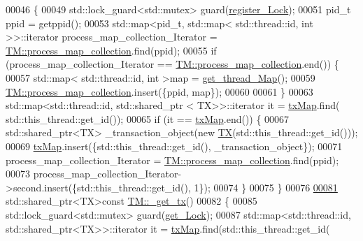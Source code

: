 \begin{DoxyCode}
00046 \{
00049     std::lock\_guard<std::mutex> guard(\hyperlink{class_t_m_aeb26546681bfe64e21606b8c012bb8c3_aeb26546681bfe64e21606b8c012bb8c3}{register\_Lock});
00051     pid\_t ppid = getppid();
00053     std::map<pid\_t, std::map< std::thread::id, int >>::iterator process\_map\_collection\_Iterator = 
      \hyperlink{class_t_m_a6d417b18213968da2a70a914e80d639b_a6d417b18213968da2a70a914e80d639b}{TM::process\_map\_collection}.find(ppid);
00055     \textcolor{keywordflow}{if} (process\_map\_collection\_Iterator == \hyperlink{class_t_m_a6d417b18213968da2a70a914e80d639b_a6d417b18213968da2a70a914e80d639b}{TM::process\_map\_collection}.end()) \{
00057         std::map< std::thread::id, int >map = \hyperlink{class_t_m_afb8bc9f42fe06c52747beb7f4c46915c_afb8bc9f42fe06c52747beb7f4c46915c}{get\_thread\_Map}();
00059         \hyperlink{class_t_m_a6d417b18213968da2a70a914e80d639b_a6d417b18213968da2a70a914e80d639b}{TM::process\_map\_collection}.insert(\{ppid, map\});
00060 
00061     \}
00063     std::map<std::thread::id, std::shared\_ptr < TX>>::iterator it = \hyperlink{class_t_m_a0333dfa193ea99d7626de74a2b932e9b_a0333dfa193ea99d7626de74a2b932e9b}{txMap}.find(
      std::this\_thread::get\_id());
00065     \textcolor{keywordflow}{if} (it == \hyperlink{class_t_m_a0333dfa193ea99d7626de74a2b932e9b_a0333dfa193ea99d7626de74a2b932e9b}{txMap}.end()) \{
00067         std::shared\_ptr<TX> \_transaction\_object(\textcolor{keyword}{new} \hyperlink{class_t_x}{TX}(std::this\_thread::get\_id()));
00069         \hyperlink{class_t_m_a0333dfa193ea99d7626de74a2b932e9b_a0333dfa193ea99d7626de74a2b932e9b}{txMap}.insert(\{std::this\_thread::get\_id(), \_transaction\_object\});
00071         process\_map\_collection\_Iterator = \hyperlink{class_t_m_a6d417b18213968da2a70a914e80d639b_a6d417b18213968da2a70a914e80d639b}{TM::process\_map\_collection}.find(ppid);
00073         process\_map\_collection\_Iterator->second.insert(\{std::this\_thread::get\_id(), 1\});
00074     \}
00075 \}
00076 
\hypertarget{_t_m_8cpp_source.tex_l00081}{}\hyperlink{class_t_m_a41cb0226cc4080c931651b13f74a0075_a41cb0226cc4080c931651b13f74a0075}{00081} std::shared\_ptr<TX>\textcolor{keyword}{const} \hyperlink{class_t_m_a41cb0226cc4080c931651b13f74a0075_a41cb0226cc4080c931651b13f74a0075}{TM::\_get\_tx}()
00082 \{
00085     std::lock\_guard<std::mutex> guard(\hyperlink{class_t_m_a123bc5aa0766a7b909bebc54a429e5b0_a123bc5aa0766a7b909bebc54a429e5b0}{get\_Lock});
00087     std::map<std::thread::id, std::shared\_ptr<TX>>::iterator it = \hyperlink{class_t_m_a0333dfa193ea99d7626de74a2b932e9b_a0333dfa193ea99d7626de74a2b932e9b}{txMap}.find(std::this\_thread::get\_id(

\end{DoxyCode}
